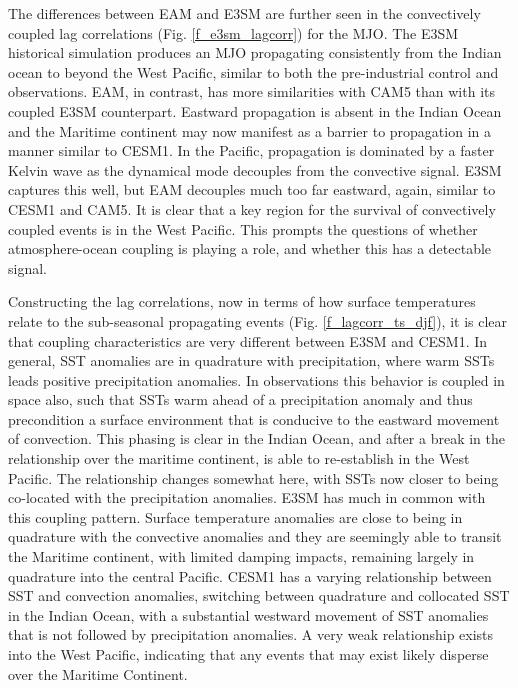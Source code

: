 \documentclass[draft,ms]{AGUTeX}
\begin{document}
\begin{article}
The differences between EAM and E3SM are further seen in the convectively coupled lag correlations (Fig. \ref{f_e3sm_lagcorr}) for the MJO. The E3SM historical simulation produces an MJO propagating consistently from the Indian ocean to beyond the West Pacific, similar to both the pre-industrial control and observations. EAM, in contrast, has more similarities with CAM5 than with its coupled E3SM counterpart. Eastward propagation is absent in the Indian Ocean and the Maritime continent may now manifest as a barrier to propagation in a manner similar to CESM1. In the Pacific, propagation is dominated by a faster Kelvin wave as the dynamical mode decouples from the convective signal. E3SM captures this well, but EAM decouples much too far eastward, again, similar to CESM1 and CAM5. It is clear that a key region for the survival of convectively coupled events is in the West Pacific. This prompts the questions of whether atmosphere-ocean coupling is playing a role, and whether this has a detectable signal. 

Constructing the lag correlations, now in terms of how surface temperatures relate to the sub-seasonal propagating events (Fig. \ref{f_lagcorr_ts_djf}), it is clear that coupling characteristics are very different between E3SM and CESM1. In general, SST anomalies are in quadrature with precipitation, where warm SSTs leads  positive precipitation anomalies. In observations this behavior is coupled in space also, such that SSTs warm ahead of a precipitation anomaly and thus precondition a surface environment that is conducive to the eastward movement of convection. This phasing is clear in the Indian Ocean, and after a break in the relationship over the maritime continent, is able to re-establish in the West Pacific. The relationship changes somewhat here, with SSTs now closer to being co-located with the precipitation anomalies. E3SM has much in common with this coupling pattern. Surface temperature anomalies are close to being in quadrature with the convective anomalies and they are seemingly able to transit the Maritime continent, with limited damping impacts, remaining largely in quadrature into the central Pacific. CESM1 has a varying relationship between SST and convection anomalies, switching between quadrature and collocated SST in the Indian Ocean, with a substantial westward movement of SST anomalies that is not followed by precipitation anomalies. A very weak relationship exists into the West Pacific, indicating that any events that may exist likely disperse over the Maritime Continent.


\end{article}
\end{document}
